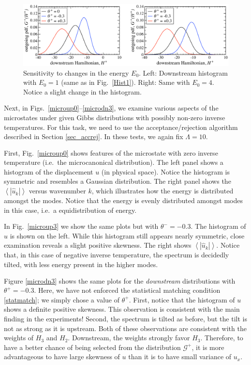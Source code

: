 \documentclass[12pt]{article}
\newcommand{\abs}[1]{\left| #1 \right|}
\newcommand{\mean}[1]{\left< #1 \right>}
\newcommand{\uhat}{\hat{u}}
\newcommand{\Gibbs}{\mathcal{G}}
\begin{document}
\begin{figure}[p]%
\begin{center}
\includegraphics[width = 0.8 \textwidth]{Hist3}
\caption{Sensitivity to changes in the energy $E_0$.
Left: Downstream histogram with $E_0 = 1$ (same as in Fig.~\ref{Hist1}). Right: Same with $E_0 = 4$. Notice a slight change in the histogram.}
\label{Hist3}
\end{center}
\end{figure}
 
 Next, in Figs.~\ref{microup0}--\ref{microdn3}, we examine various aspects of the microstates under given Gibbs distributions with possibly non-zero inverse temperatures. For this task, we need to use the acceptance/rejection algorithm described in Section \ref{sec_accrej}. In these tests, we again fix $\Lambda = 10$.
 
 First, Fig.~\ref{microup0} shows features of the microstate with zero inverse temperature (i.e.~the microcanonical distribution). The left panel shows a histogram of the displacement $u$ (in physical space). Notice the histogram is symmetric and resembles a Gaussian distribution. The right panel shows the $\mean{\abs{\uhat_k}}$ versus wavenumber $k$, which illustrates how the energy is distributed amongst the modes. Notice that the energy is evenly distributed amongst modes in this case, i.e.~a equidistribution of energy.
 
 In Fig.~\ref{microup3} we show the same plots but with $\theta^- = -0.3$. The histogram of $u$ is shown on the left. While this histogram still appears nearly symmetric, close examination reveals a slight positive skewness. The right shows $\mean{\abs{\uhat_k}}$. Notice that, in this case of negative inverse temperature, the spectrum is decidedly tilted, with less energy present in the higher modes.
 
 Figure \ref{microdn3} shows the same plots for the {\em downstream} distributions with $\theta^+ = -0.3$. Here, we have not enforced the statistical matching condition \eqref{statmatch}; we simply chose a value of $\theta^+$. First, notice that the histogram of $u$ shows a definite positive skewness. This observation is consistent with the main finding in the experiments! Second, the spectrum is tilted as before, but the tilt is not as strong as it is upstream. Both of these observations are consistent with the weights of $H_3$ and $H_2$. Downstream, the weights strongly favor $H_3$. Therefore, to have a better chance of being selected from the distribution $\Gibbs^{+}$, it is more advantageous to have large skewness of $u$ than it is to have small variance of $u_x$.
  
\end{document}
